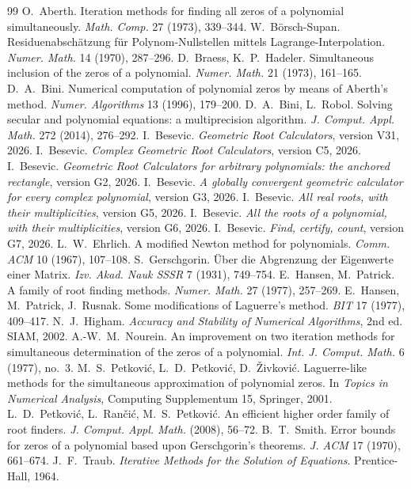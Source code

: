 \documentclass[10pt,a4paper]{article}
\theoremstyle{definition}
\numberwithin{equation}{section}
\begin{document}
\begin{thebibliography}{99}\small
{} O.~Aberth. Iteration methods for finding all zeros of a polynomial simultaneously. \emph{Math. Comp.} 27 (1973), 339--344.
 W.~B\"orsch-Supan. Residuenabsch\"atzung f\"ur Polynom-Nullstellen mittels Lagrange-Interpolation. \emph{Numer. Math.} 14 (1970), 287--296.
 D.~Braess, K.~P.~Hadeler. Simultaneous inclusion of the zeros of a polynomial. \emph{Numer. Math.} 21 (1973), 161--165.
 D.~A.~Bini. Numerical computation of polynomial zeros by means of Aberth's method. \emph{Numer. Algorithms} 13 (1996), 179--200.
 D.~A.~Bini, L.~Robol. Solving secular and polynomial equations: a multiprecision algorithm. \emph{J. Comput. Appl. Math.} 272 (2014), 276--292.
 I.~Besevic. \emph{Geometric Root Calculators}, version V31, 2026.
 I.~Besevic. \emph{Complex Geometric Root Calculators}, version C5, 2026.
 I.~Besevic. \emph{Geometric Root Calculators for arbitrary polynomials: the anchored rectangle}, version G2, 2026.
 I.~Besevic. \emph{A globally convergent geometric calculator for every complex polynomial}, version G3, 2026.
 I.~Besevic. \emph{All real roots, with their multiplicities}, version G5, 2026.
 I.~Besevic. \emph{All the roots of a polynomial, with their multiplicities}, version G6, 2026.
 I.~Besevic. \emph{Find, certify, count}, version G7, 2026.
 L.~W.~Ehrlich. A modified Newton method for polynomials. \emph{Comm. ACM} 10 (1967), 107--108.
 S.~Gerschgorin. \"Uber die Abgrenzung der Eigenwerte einer Matrix. \emph{Izv. Akad. Nauk SSSR} 7 (1931), 749--754.
 E.~Hansen, M.~Patrick. A family of root finding methods. \emph{Numer. Math.} 27 (1977), 257--269.
 E.~Hansen, M.~Patrick, J.~Rusnak. Some modifications of Laguerre's method. \emph{BIT} 17 (1977), 409--417.
 N.~J.~Higham. \emph{Accuracy and Stability of Numerical Algorithms}, 2nd ed. SIAM, 2002.
 A.-W.~M.~Nourein. An improvement on two iteration methods for simultaneous determination of the zeros of a polynomial. \emph{Int. J. Comput. Math.} 6 (1977), no.~3.
 M.~S.~Petkovi\'c, L.~D.~Petkovi\'c, D.~\v{Z}ivkovi\'c. Laguerre-like methods for the simultaneous approximation of polynomial zeros. In \emph{Topics in Numerical Analysis}, Computing Supplementum 15, Springer, 2001.
 L.~D.~Petkovi\'c, L.~Ran\v{c}i\'c, M.~S.~Petkovi\'c. An efficient higher order family of root finders. \emph{J. Comput. Appl. Math.} (2008), 56--72.
 B.~T.~Smith. Error bounds for zeros of a polynomial based upon Gerschgorin's theorems. \emph{J. ACM} 17 (1970), 661--674.
 J.~F.~Traub. \emph{Iterative Methods for the Solution of Equations}. Prentice-Hall, 1964.
\end{thebibliography}
\end{document}
